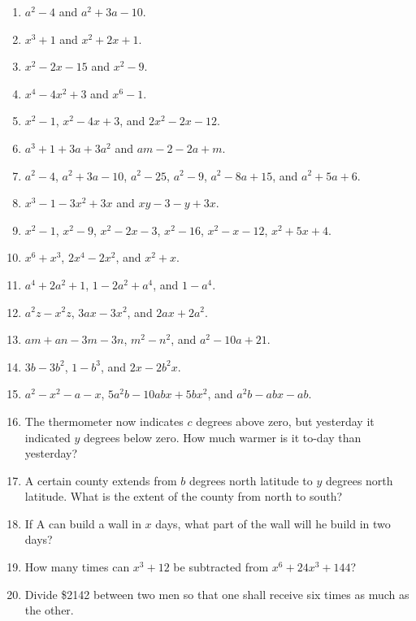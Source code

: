 \documentclass{book}
\begin{document}
\begin{enumerate}
\item $a^{2} - 4$ and $a^{2} + 3 a - 10$.

\item $x^{3} + 1$ and $x^{2} + 2 x + 1$.

\item $x^{2} - 2 x - 15$ and $x^{2} - 9$.

\item $x^{4} - 4 x^{2} + 3$ and $x^{6} - 1$.

\item $x^2 - 1$, $x^2 - 4x + 3$, and $2x^2 - 2x - 12$.

\item $a^3 + 1 + 3a + 3a^2$ and $am - 2 - 2a + m$.

\item $a^2 - 4$, $a^2 + 3a - 10$, $a^2 - 25$, $a^2 - 9$, $a^2 - 8a
+ 15$, and $a^2 + 5a + 6$.

\item $x^3 - 1 - 3x^2 + 3x$ and $xy - 3 - y +3x$.

\item $x^2 - 1$, $x^2 - 9$, $x^2 - 2x - 3$, $x^2 - 16$, $x^2 - x -
12$, $x^2 + 5x + 4$.

\item $x^6 + x^3$, $2x^4 - 2x^2$, and $x^2 + x$.

\item $a^4 + 2a^2 + 1$, $1 - 2a^2 + a^4$, and $1 - a^4$.

\item $a^2z - x^2z$, $3ax - 3x^2$, and $2ax + 2a^2$.

\item $am + an - 3m - 3n$, $m^2 - n^2$, and $a^2 - 10a + 21$.

\item $3b - 3b^2$, $1 - b^3$, and $2x - 2b^2x$.

\item $a^2 - x^2 - a - x$, $5a^2b - 10abx + 5bx^2$, and $a^2b -
abx - ab$.

\item The thermometer now indicates $c$ degrees above zero, but
yesterday it indicated $y$ degrees below zero. How much warmer is
it to-day than yesterday?

\item A certain county extends from $b$ degrees north latitude to
$y$ degrees north latitude. What is the extent of the county from
north to south?

\item If A can build a wall in $x$ days, what part of the wall
will he build in two days?

\item How many times can $x^3 + 12$ be subtracted from $x^6 + 24
x^3 + 144$?

\item Divide \$2142 between two men so that one shall receive six
times as much as the other.
\end{enumerate}
\end{document}
